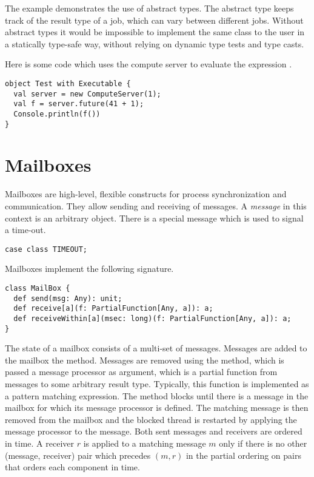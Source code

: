 {The example demonstrates the use of abstract types. The abstract type
 keeps track of the result type of a job, which can vary
between different jobs. Without abstract types it would be impossible
to implement the same class to the user in a statically type-safe
way, without relying on dynamic type tests and type casts.


Here is some code which uses the compute server to evaluate 
the expression .
\begin{lstlisting}
object Test with Executable {
  val server = new ComputeServer(1);
  val f = server.future(41 + 1);
  Console.println(f())
}
\end{lstlisting}

\section{Mailboxes}
\label{sec:mailbox}

Mailboxes are high-level, flexible constructs for process
synchronization and communication. They allow sending and receiving of
messages. A {\em message} in this context is an arbitrary object.
There is a special message  which is used to signal a
time-out.
\begin{lstlisting}
case class TIMEOUT;
\end{lstlisting}
Mailboxes implement the following signature.
\begin{lstlisting}
class MailBox {
  def send(msg: Any): unit;
  def receive[a](f: PartialFunction[Any, a]): a;
  def receiveWithin[a](msec: long)(f: PartialFunction[Any, a]): a;
}
\end{lstlisting}
The state of a mailbox consists of a multi-set of messages.
Messages are added to the mailbox the  method. Messages
are removed using the  method, which is passed a message
processor  as argument, which is a partial function from
messages to some arbitrary result type. Typically, this function is
implemented as a pattern matching expression. The 
method blocks until there is a message in the mailbox for which its
message processor is defined.  The matching message is then removed
from the mailbox and the blocked thread is restarted by applying the
message processor to the message. Both sent messages and receivers are
ordered in time. A receiver $r$ is applied to a matching message $m$
only if there is no other (message, receiver) pair which precedes $(m,
r)$ in the partial ordering on pairs that orders each component in
time.

}
